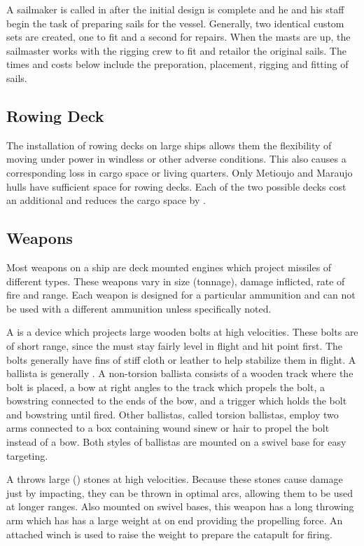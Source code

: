 \begin{multicols*}{2}
A sailmaker is called in after the initial design is complete and he and his staff begin the task of preparing sails for the vessel. Generally, two identical custom sets are created, one to fit and a second for repairs. When the masts are up, the sailmaster works with the rigging crew to fit and retailor the original sails. The times and costs below include the preporation, placement, rigging and fitting of sails.


\subsection{Rowing Deck}
The installation of rowing decks on large ships allows them the flexibility of moving under power in windless or other adverse conditions. This also causes a corresponding loss in cargo space or living quarters. Only Metioujo and Maraujo hulls have sufficient space for rowing decks. Each of the two possible decks cost an additional  and reduces the cargo space by .
\subsection{Weapons}
Most weapons on a ship are deck mounted engines which project missiles of different types. These weapons vary in size (tonnage), damage inflicted, rate of fire and range. Each weapon is designed for a particular ammunition and can not be used with a different ammunition unless specifically noted.

A  is a device which projects large wooden bolts at high velocities. These bolts are of short range, since the must stay fairly level in flight and hit point first. The bolts generally have fins of stiff cloth or leather to help stabilize them in flight. A ballista is generally . A non-torsion ballista consists of a wooden track where the bolt is placed, a bow at right angles to the track which propels the bolt, a bowstring connected to the ends of the bow, and a trigger which holds the bolt and bowstring until fired. Other ballistas, called torsion ballistas, employ two arms connected to a box containing wound sinew or hair to propel the bolt instead of a bow. Both styles of ballistas are mounted on a swivel base for easy targeting.

A  throws large () stones at high velocities. Because these stones cause damage just by impacting, they can be thrown in optimal arcs, allowing them to be used at longer ranges. Also mounted on swivel bases,
this weapon has a long throwing arm which has has a large weight at on end providing the propelling force. An attached winch is used to raise the weight to prepare the catapult for firing.


\end{multicols*}

